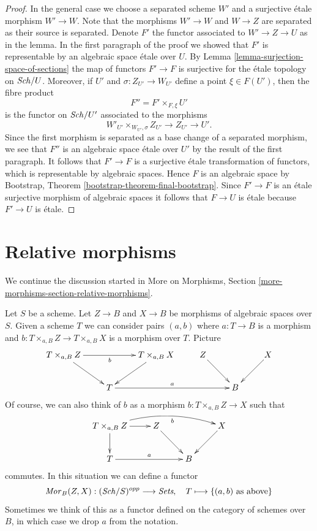 \begin{proof}
\medskip\noindent
In the general case we choose a separated scheme $W'$ and a surjective
\'etale morphism $W' \to W$. Note that the morphisms $W' \to W$ and
$W \to Z$ are separated as their source is separated. Denote $F'$ the
functor associated to $W' \to Z \to U$ as in the lemma. In the first
paragraph of the proof we showed that $F'$ is representable by an
algebraic space \'etale over $U$. By
Lemma \ref{lemma-surjection-space-of-sections}
the map of functors $F' \to F$ is surjective for the \'etale topology
on $\mathit{Sch}/U$. Moreover, if $U'$ and $\sigma : Z_{U'} \to W_{U'}$
define a point $\xi \in F(U')$, then the fibre product
$$
F'' = F' \times_{F, \xi} U'
$$
is the functor on $\mathit{Sch}/U'$ associated to the morphisms
$$
W'_{U'} \times_{W_{U'}, \sigma} Z_{U'} \to Z_{U'} \to U'.
$$
Since the first morphism is separated as a base change of a separated
morphism, we see that $F''$ is an algebraic space \'etale over $U'$
by the result of the first paragraph. It follows that $F' \to F$ is a
surjective \'etale transformation of functors, which is representable
by algebraic spaces. Hence $F$ is an algebraic space by
Bootstrap, Theorem \ref{bootstrap-theorem-final-bootstrap}.
Since $F' \to F$ is an \'etale surjective morphism of algebraic spaces
it follows that $F \to U$ is \'etale because $F' \to U$ is \'etale.
\end{proof}









\section{Relative morphisms}
\label{section-relative-morphisms}

\noindent
We continue the discussion started in
More on Morphisms, Section \ref{more-morphisms-section-relative-morphisms}.

\medskip\noindent
Let $S$ be a scheme. Let $Z \to B$ and $X \to B$ be morphisms of
algebraic spaces over $S$. Given a scheme $T$ we can consider pairs
$(a, b)$ where $a : T \to B$
is a morphism and $b : T \times_{a, B} Z \to T \times_{a, B} X$
is a morphism over $T$. Picture
\begin{equation}
\label{equation-hom}
\vcenter{
\xymatrix{
T \times_{a, B} Z \ar[rd] \ar[rr]_b & &
T \times_{a, B} X \ar[ld] & Z \ar[rd] & & X \ar[ld] \\
& T \ar[rrr]^a & & & B
}
}
\end{equation}
Of course, we can also think of $b$ as a morphism
$b : T \times_{a, B} Z \to X$ such that
$$
\xymatrix{
T \times_{a, B} Z \ar[r] \ar[d] \ar@/^1pc/[rrr]_-b &
Z \ar[rd] & & X \ar[ld] \\
T \ar[rr]^a & & B
}
$$
commutes. In this situation we can define a functor
\begin{equation}
\label{equation-hom-functor}
\mathit{Mor}_B(Z, X) : (\mathit{Sch}/S)^{opp} \longrightarrow \textit{Sets},
\quad
T \longmapsto \{(a, b)\text{ as above}\}
\end{equation}
Sometimes we think of this as a functor defined on the category
of schemes over $B$, in which case we drop $a$ from the notation.

